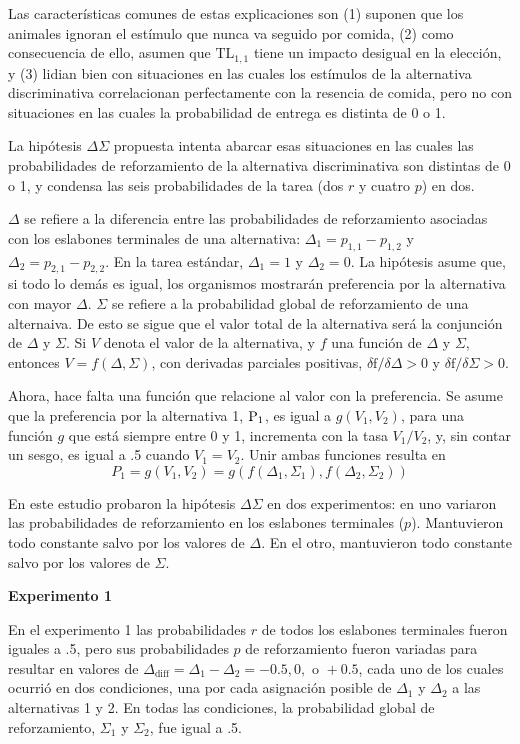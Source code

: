 \documentclass[a4paper,12pt]{article}
\begin{document}
Las características comunes de estas explicaciones son (1) suponen que los animales ignoran el estímulo que nunca va seguido por comida, (2) como consecuencia de ello, asumen que $\mbox{TL}_{1,1}$ tiene un impacto desigual en la elección, y (3) lidian bien con situaciones en las cuales los estímulos de la alternativa discriminativa correlacionan perfectamente con la resencia de comida, pero no con situaciones en las cuales la probabilidad de entrega es distinta de 0 o 1.

La hipótesis $\Delta\Sigma$ propuesta intenta abarcar esas situaciones en las cuales las probabilidades de reforzamiento de la alternativa discriminativa son distintas de 0 o 1, y condensa las seis probabilidades de la tarea (dos $r$ y cuatro $p$) en dos.

$\Delta$ se refiere a la diferencia entre las probabilidades de reforzamiento asociadas con los eslabones terminales de una alternativa: $\Delta_1=p_{1,1}-p_{1,2}$ y $\Delta_2=p_{2,1}-p_{2,2}$. En la tarea estándar, $\Delta_1=1$ y $\Delta_2=0$. La hipótesis asume que, si todo lo demás es igual, los organismos mostrarán preferencia por la alternativa con mayor $\Delta$. $\Sigma$ se refiere a la probabilidad global de reforzamiento de una alternaiva. De esto se sigue que el valor total de la alternativa será la conjunción de $\Delta$ y $\Sigma$. Si $V$ denota el valor de la alternativa, y $f$ una función de $\Delta$ y $\Sigma$, entonces $V=f(\Delta,\Sigma)$, con derivadas parciales positivas, $\delta \mbox{f}/\delta\Delta>0$ y $\delta \mbox{f}/\delta\Sigma>0$.

Ahora, hace falta una función que relacione al valor con la preferencia. Se asume que la preferencia por la alternativa 1, $\mbox P_1$, es igual a $g (V_1, V_2)$, para una función $g$ que está siempre entre 0 y 1, incrementa con la tasa $V_1/V_2$, y, sin contar un sesgo, es igual a .5 cuando $V_1=V_2$. Unir ambas funciones resulta en
$$P_1=g(V_1, V_2)=g (f(\Delta_1,\Sigma_1),f(\Delta_2,\Sigma_2))$$

En este estudio probaron la hipótesis $\Delta\Sigma$ en dos experimentos: en uno variaron las probabilidades de reforzamiento en los eslabones terminales ($p$). Mantuvieron todo constante salvo por los valores de $\Delta$. En el otro, mantuvieron todo constante salvo por los valores de $\Sigma$.

{\bfseries Experimento 1}

En el experimento 1 las probabilidades $r$ de todos los eslabones terminales fueron iguales a .5, pero sus probabilidades $p$ de reforzamiento fueron variadas para resultar en valores de $\Delta_{\mbox{diff}}=\Delta_1-\Delta_2=-0{.}5, 0, \mbox{ o } +0{.}5$, cada uno de los cuales ocurrió en dos condiciones, una por cada asignación posible de $\Delta_1$ y $\Delta_2$ a las alternativas 1 y 2. En todas las condiciones, la probabilidad global de reforzamiento, $\Sigma_1$ y $\Sigma_2$, fue igual a .5.
\end{document}

